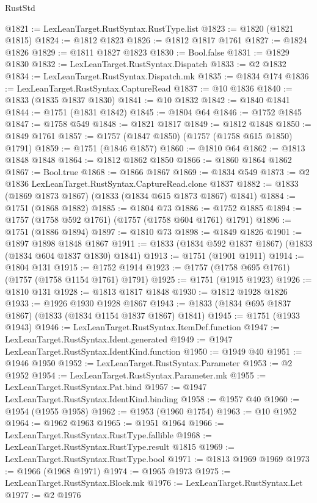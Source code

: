 \begin{lexlean}{RustStd}
\begin{coremodule}
@1821 := LexLeanTarget.RustSyntax.RustType.list
@1823 := @1820 (@1821 @1815)
@1824 := @1812 @1823
@1826 := @1812 @1817 @1761
@1827 := @1824 @1826
@1829 := @1811 @1827 @1823
@1830 := Bool.false
@1831 := @1829 @1830
@1832 := LexLeanTarget.RustSyntax.Dispatch
@1833 := @2 @1832
@1834 := LexLeanTarget.RustSyntax.Dispatch.mk
@1835 := @1834 @174
@1836 := LexLeanTarget.RustSyntax.CaptureRead
@1837 := @10 @1836
@1840 := @1833 (@1835 @1837 @1830)
@1841 := @10 @1832
@1842 := @1840 @1841
@1844 := @1751 (@1831 @1842)
@1845 := @1804 @64
@1846 := @1752 @1845
@1847 := @1758 @549
@1848 := @1821 @1817
@1849 := @1812 @1848
@1850 := @1849 @1761
@1857 := @1757 (@1847 @1850) (@1757 (@1758 @615 @1850) @1791)
@1859 := @1751 (@1846 @1857)
@1860 := @1810 @64
@1862 := @1813 @1848 @1848
@1864 := @1812 @1862 @1850
@1866 := @1860 @1864 @1862
@1867 := Bool.true
@1868 := @1866 @1867
@1869 := @1834 @549
@1873 := @2 @1836 LexLeanTarget.RustSyntax.CaptureRead.clone @1837
@1882 := @1833 (@1869 @1873 @1867) (@1833 (@1834 @615 @1873 @1867) @1841)
@1884 := @1751 (@1868 @1882)
@1885 := @1804 @73
@1886 := @1752 @1885
@1894 := @1757 (@1758 @592 @1761) (@1757 (@1758 @604 @1761) @1791)
@1896 := @1751 (@1886 @1894)
@1897 := @1810 @73
@1898 := @1849 @1826
@1901 := @1897 @1898 @1848 @1867
@1911 := @1833 (@1834 @592 @1837 @1867) (@1833 (@1834 @604 @1837 @1830) @1841)
@1913 := @1751 (@1901 @1911)
@1914 := @1804 @131
@1915 := @1752 @1914
@1923 := @1757 (@1758 @695 @1761) (@1757 (@1758 @1154 @1761) @1791)
@1925 := @1751 (@1915 @1923)
@1926 := @1810 @131
@1928 := @1813 @1817 @1848
@1930 := @1812 @1928 @1826
@1933 := @1926 @1930 @1928 @1867
@1943 := @1833 (@1834 @695 @1837 @1867) (@1833 (@1834 @1154 @1837 @1867) @1841)
@1945 := @1751 (@1933 @1943)
@1946 := LexLeanTarget.RustSyntax.ItemDef.function
@1947 := LexLeanTarget.RustSyntax.Ident.generated
@1949 := @1947 LexLeanTarget.RustSyntax.IdentKind.function
@1950 := @1949 @40
@1951 := @1946 @1950
@1952 := LexLeanTarget.RustSyntax.Parameter
@1953 := @2 @1952
@1954 := LexLeanTarget.RustSyntax.Parameter.mk
@1955 := LexLeanTarget.RustSyntax.Pat.bind
@1957 := @1947 LexLeanTarget.RustSyntax.IdentKind.binding
@1958 := @1957 @40
@1960 := @1954 (@1955 @1958)
@1962 := @1953 (@1960 @1754)
@1963 := @10 @1952
@1964 := @1962 @1963
@1965 := @1951 @1964
@1966 := LexLeanTarget.RustSyntax.RustType.fallible
@1968 := LexLeanTarget.RustSyntax.RustType.result @1815
@1969 := LexLeanTarget.RustSyntax.RustType.bool
@1971 := @1813 @1969 @1969
@1973 := @1966 (@1968 @1971)
@1974 := @1965 @1973
@1975 := LexLeanTarget.RustSyntax.Block.mk
@1976 := LexLeanTarget.RustSyntax.Let
@1977 := @2 @1976

\end{coremodule}
\end{lexlean}
